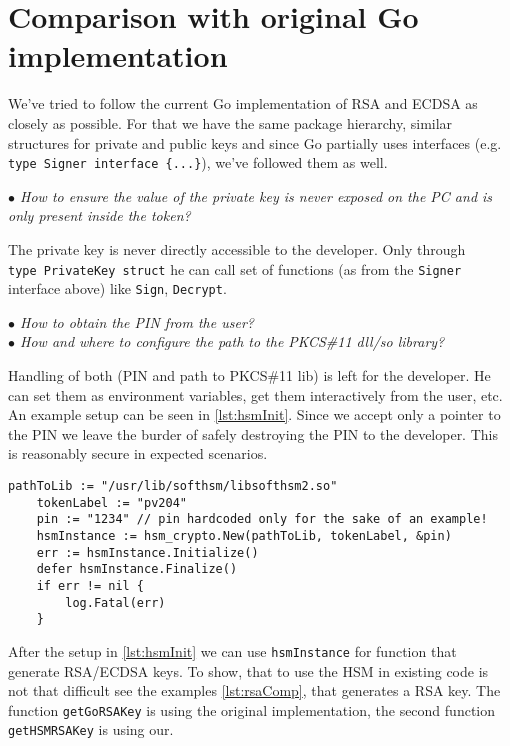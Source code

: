 \documentclass[a4paper]{scrartcl}
\begin{document}
\section{Comparison with original Go implementation}
We've tried to follow the current Go implementation of RSA and ECDSA as closely as possible. For that we have the same package hierarchy, similar structures for private and public keys and since Go partially uses interfaces (e.g. \lstinline[columns=fixed]|type Signer interface {...}|), we've followed them as well.

\textit{$\bullet$ How to ensure the value of the private key is never exposed on the PC and is only present inside the token?}

The private key is never directly accessible to the developer. Only through\\ \lstinline[columns=fixed]{type PrivateKey struct} he can call set of functions (as from the \lstinline[columns=fixed]{Signer} interface above) like \lstinline[columns=fixed]{Sign}, \lstinline[columns=fixed]{Decrypt}.

\textit{$\bullet$ How to obtain the PIN from the user?}\\
\indent\textit{$\bullet$ How and where to configure the path to the PKCS\#11 dll/so library?}

Handling of both (PIN and path to PKCS\#11 lib) is left for the developer. He can set them as environment variables, get them interactively from the user, etc. An example setup can be seen in \ref{lst:hsmInit}. Since we accept only a pointer to the PIN we leave the burder of safely destroying the PIN to the developer. This is reasonably secure in expected scenarios.

\begin{lstlisting}[caption=Comparison of the original and HSM implementations, captionpos=b, label={lst:hsmInit}]
    pathToLib := "/usr/lib/softhsm/libsofthsm2.so"
    tokenLabel := "pv204"
    pin := "1234" // pin hardcoded only for the sake of an example!
    hsmInstance := hsm_crypto.New(pathToLib, tokenLabel, &pin)
    err := hsmInstance.Initialize()
    defer hsmInstance.Finalize()
    if err != nil {
        log.Fatal(err)
    }
\end{lstlisting}

After the setup in \ref{lst:hsmInit} we can use \lstinline[columns=fixed]{hsmInstance} for function that generate RSA/ECDSA keys. To show, that to use the HSM in existing code is not that difficult see the examples \ref{lst:rsaComp}, that generates a RSA key. The function \lstinline[columns=fixed]{getGoRSAKey} is using the original implementation, the second function \lstinline[columns=fixed]{getHSMRSAKey} is using our.
\end{document}
